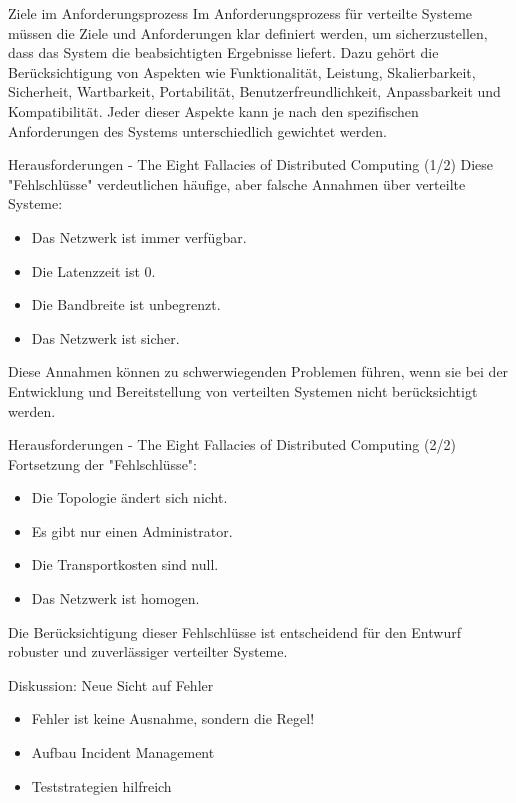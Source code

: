 \documentclass{beamer}
\begin{document}
\begin{frame}{Ziele im Anforderungsprozess}
    Im Anforderungsprozess für verteilte Systeme müssen die Ziele und Anforderungen klar definiert werden, um sicherzustellen, dass das System die beabsichtigten Ergebnisse liefert.  Dazu gehört die Berücksichtigung von Aspekten wie Funktionalität, Leistung, Skalierbarkeit, Sicherheit, Wartbarkeit, Portabilität, Benutzerfreundlichkeit, Anpassbarkeit und Kompatibilität.  Jeder dieser Aspekte kann je nach den spezifischen Anforderungen des Systems unterschiedlich gewichtet werden.
\end{frame}



\begin{frame}{Herausforderungen - The Eight Fallacies of Distributed Computing (1/2)}
  Diese "Fehlschlüsse" verdeutlichen häufige, aber falsche Annahmen über verteilte Systeme:
  \begin{itemize}
    \item Das Netzwerk ist immer verfügbar.
    \item Die Latenzzeit ist 0.
    \item Die Bandbreite ist unbegrenzt.
    \item Das Netzwerk ist sicher.
  \end{itemize}
  Diese Annahmen können zu schwerwiegenden Problemen führen, wenn sie bei der Entwicklung und Bereitstellung von verteilten Systemen nicht berücksichtigt werden.
\end{frame}


\begin{frame}{Herausforderungen - The Eight Fallacies of Distributed Computing (2/2)}
  Fortsetzung der "Fehlschlüsse":
  \begin{itemize}
    \item Die Topologie ändert sich nicht.
    \item Es gibt nur einen Administrator.
    \item Die Transportkosten sind null.
    \item Das Netzwerk ist homogen.
  \end{itemize}
  Die Berücksichtigung dieser Fehlschlüsse ist entscheidend für den Entwurf robuster und zuverlässiger verteilter Systeme.
\end{frame}

\begin{frame}{Diskussion: Neue Sicht auf Fehler}

  \begin{itemize}
    \item Fehler ist keine Ausnahme, sondern die Regel!
    \item Aufbau Incident Management
    \item Teststrategien hilfreich 
  \end{itemize}
\end{frame}
\end{document}
